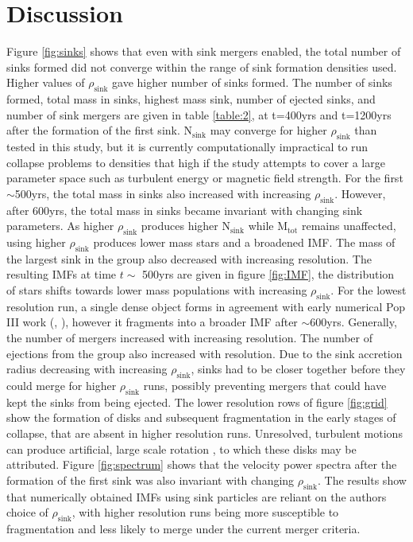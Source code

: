 \documentclass[fleqn,usenatbib]{mnras}
\begin{document}
\section{Discussion}
Figure \ref{fig:sinks} shows that even with sink mergers enabled, the total number of sinks formed did not converge within the range of sink formation densities used. Higher values of $\rho_{\text{sink}}$ gave higher number of sinks formed. The number of sinks formed, total mass in sinks, highest mass sink, number of ejected sinks, and number of sink mergers are given in table \ref{table:2}, at t=400yrs and t=1200yrs after the formation of the first sink. N$_{\text{sink}}$ may converge for higher $\rho_{\text{sink}}$ than tested in this study, but it is currently computationally impractical to run collapse problems to densities that high if the study attempts to cover a large parameter space such as turbulent energy or magnetic field strength. For the first $\sim$500yrs, the total mass in sinks also increased with increasing $\rho_{\text{sink}}$. However, after 600yrs, the total mass in sinks became invariant with changing sink parameters. As higher $\rho_{\text{sink}}$ produces higher N$_{\text{sink}}$ while M$_{\text{tot}}$ remains unaffected, using higher $\rho_{\text{sink}}$ produces lower mass stars and a broadened IMF. The mass of the largest sink in the group also decreased with increasing resolution. The resulting IMFs at time $t\sim$ 500yrs are given in figure \ref{fig:IMF}, the distribution of stars shifts towards lower mass populations with increasing $\rho_{\text{sink}}$. For the lowest resolution run, a single dense object forms in agreement with early numerical Pop III work (\citealt{Bromm1999}, \citealt{Haiman1996}), however it fragments into a broader IMF after $\sim$600yrs. Generally, the number of mergers increased with increasing resolution. The number of ejections from the group also increased with resolution. Due to the sink accretion radius decreasing with increasing $\rho_{\text{sink}}$, sinks had to be closer together before they could merge for higher $\rho_{\text{sink}}$ runs, possibly preventing mergers that could have kept the sinks from being ejected. The lower resolution rows of figure \ref{fig:grid} show the formation of disks and subsequent fragmentation in the early stages of collapse, that are absent in higher resolution runs. Unresolved, turbulent motions can produce artificial, large scale rotation \citep{Seifried2017}, to which these disks may be attributed. Figure \ref{fig:spectrum} shows that the velocity power spectra after the formation of the first sink was also invariant with changing $\rho_{\text{sink}}$. The results show that numerically obtained IMFs using sink particles are reliant on the authors choice of $\rho_{\text{sink}}$, with higher resolution runs being more susceptible to fragmentation and less likely to merge under the current merger criteria. 
\end{document}
